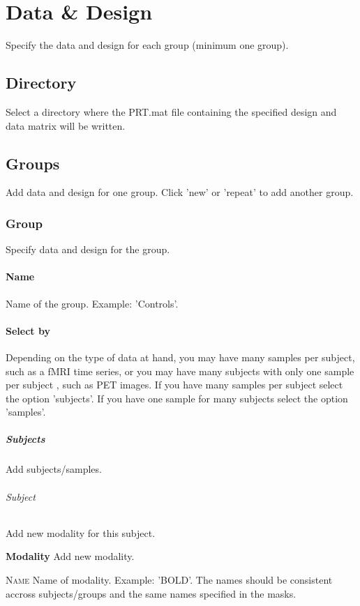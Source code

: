 
\chapter{Data \& Design  \label{Chap:data}}

\vskip 1.5cm

Specify the data and design for each group (minimum one group).


\section{Directory}
Select a directory where the PRT.mat file containing the specified design and data matrix will be written.


\section{Groups}
Add data and design for one group. Click 'new' or 'repeat' to add another group.


\subsection{Group}
Specify data and design for the group.


\subsubsection{Name}
Name of the group. Example: 'Controls'.


\subsubsection{Select by}
Depending on the type of data at hand, you may have many samples per subject, such as a fMRI time series, or you may have many subjects with only one sample per subject , such as PET images. If you have many samples per subject select the option 'subjects'. If you have one sample for many subjects select the option 'samples'.


\paragraph{Subjects}
Add subjects/samples.


\subparagraph{Subject}
Add new modality for this subject.


\textbf{Modality}
Add new modality.


\textsc{Name}
Name of modality. Example: 'BOLD'. The names should be consistent accross subjects/groups and the same names specified in the masks.


